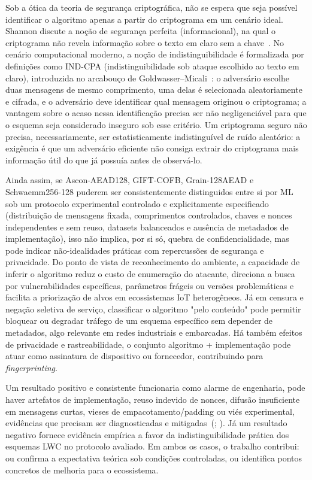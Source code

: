 Sob a ótica da teoria de segurança criptográfica, não se espera que seja
possível identificar o algoritmo apenas a partir do criptograma em um cenário
ideal. Shannon discute a noção de segurança perfeita (informacional), na qual o
criptograma não revela informação sobre o texto em claro sem a
chave~\cite{ShannonWeaver1949MTC}. %
No cenário computacional moderno, a noção de
indistinguibilidade é formalizada por definições como IND-CPA
(indistinguibilidade sob ataque escolhido ao texto em claro), introduzida no
arcabouço de Goldwasser--Micali~\cite{GoldwasserMicali1984PE}: o adversário
escolhe duas mensagens de mesmo comprimento, uma delas é selecionada
aleatoriamente e cifrada, e o adversário deve identificar qual mensagem
originou o criptograma; a vantagem sobre o acaso nessa identificação precisa
ser não negligenciável para que o esquema seja considerado inseguro sob esse
critério. Um criptograma seguro não precisa, necessariamente, ser
estatisticamente indistinguível de ruído aleatório: a exigência é que um
adversário eficiente não consiga extrair do criptograma mais informação útil
do que já possuía antes de observá-lo.

Ainda assim, se Ascon-AEAD128, GIFT-COFB, Grain-128AEAD e Schwaemm256-128
puderem ser consistentemente distinguidos entre si por ML sob um protocolo experimental controlado e explicitamente
especificado (distribuição de mensagens fixada, comprimentos controlados, chaves
e nonces independentes e sem reuso, datasets balanceados e ausência de metadados
de implementação), isso não implica, por si só, quebra de confidencialidade, mas
pode indicar não-idealidades práticas com repercussões de segurança e
privacidade. Do ponto de vista de reconhecimento do ambiente, a capacidade de
inferir o algoritmo reduz o custo de enumeração do atacante, direciona a busca
por vulnerabilidades específicas, parâmetros frágeis ou versões problemáticas e
facilita a priorização de alvos em ecossistemas IoT heterogêneos. Já em censura
e negação seletiva de serviço, classificar o algoritmo "pelo conteúdo"  pode
permitir bloquear ou degradar tráfego de um esquema específico sem depender de
metadados, algo relevante em redes industriais e embarcadas. Há também efeitos
de privacidade e rastreabilidade, o conjunto algoritmo + implementação pode
atuar como assinatura de dispositivo ou fornecedor, contribuindo para
\emph{fingerprinting}.

Um resultado positivo e consistente funcionaria como alarme de engenharia, pode
haver artefatos de implementação, reuso indevido de nonces, difusão insuficiente
em mensagens curtas, vieses de empacotamento/padding ou viés experimental,
evidências que precisam ser diagnosticadas e
mitigadas~(\cite{Turan2023NISTLWCFinal};
\cite{Dobraunig2021AsconSecurity}). Já um resultado negativo fornece evidência
empírica a favor da indistinguibilidade prática dos esquemas LWC no protocolo
avaliado. Em ambos os casos, o trabalho contribui: ou confirma a expectativa
teórica sob condições controladas, ou identifica pontos concretos de melhoria
para o ecossistema.

